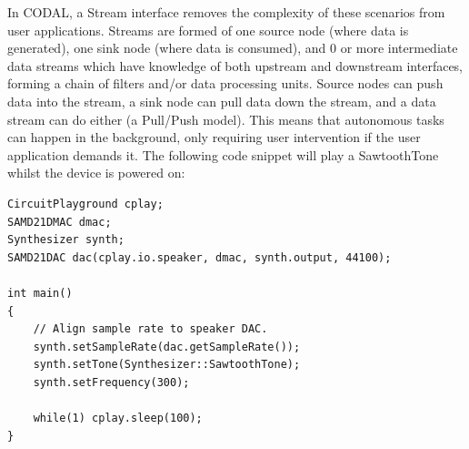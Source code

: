 In CODAL, a Stream interface removes the complexity of these scenarios from user applications. Streams are formed of one source node (where data is generated), one sink node (where data is consumed), and 0 or more intermediate data streams which have knowledge of both upstream and downstream interfaces, forming a chain of filters and/or data processing units. Source nodes can push data into the stream, a sink node can pull data down the stream, and a data stream can do either (a Pull/Push model). This means that autonomous tasks can happen in the background, only requiring user intervention if the user application demands it.
The following code snippet will play a SawtoothTone whilst the device is powered on:
\begin{lstlisting}
CircuitPlayground cplay;
SAMD21DMAC dmac;
Synthesizer synth;
SAMD21DAC dac(cplay.io.speaker, dmac, synth.output, 44100);

int main()
{
    // Align sample rate to speaker DAC.
    synth.setSampleRate(dac.getSampleRate());
    synth.setTone(Synthesizer::SawtoothTone);
    synth.setFrequency(300);

    while(1) cplay.sleep(100);
}
\end{lstlisting}